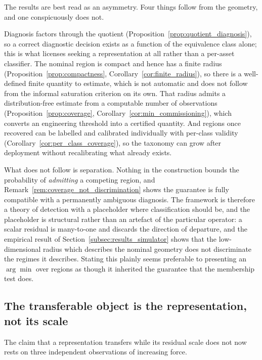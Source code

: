 \documentclass[a4paper]{cas-sc}
\begin{document}
The results are best read as an asymmetry. Four things follow from the
geometry, and one conspicuously does not.

Diagnosis factors through the quotient
(Proposition~\ref{prop:quotient_diagnosis}), so a correct diagnostic decision
exists as a function of the equivalence class alone; this is what licenses
seeking a representation at all rather than a per-asset classifier. The
nominal region is compact and hence has a finite radius
(Proposition~\ref{prop:compactness},
Corollary~\ref{cor:finite_radius}), so there is a well-defined finite quantity
to estimate, which is not automatic and does not follow from the informal
saturation criterion on its own. That radius admits a distribution-free
estimate from a computable number of observations
(Proposition~\ref{prop:coverage},
Corollary~\ref{cor:min_commissioning}), which converts an engineering
threshold into a certified quantity. And regions once recovered can be
labelled and calibrated individually with per-class validity
(Corollary~\ref{cor:per_class_coverage}), so the taxonomy can grow after
deployment without recalibrating what already exists.

What does not follow is separation. Nothing in the construction bounds the
probability of \emph{admitting} a competing region, and
Remark~\ref{rem:coverage_not_discrimination} shows the guarantee is fully
compatible with a permanently ambiguous diagnosis. The framework is therefore
a theory of detection with a placeholder where classification should be, and
the placeholder is structural rather than an artefact of the particular
operator: a scalar residual is many-to-one and discards the direction of
departure, and the empirical result of
Section~\ref{subsec:results_simulator} shows that the low-dimensional radius
which describes the nominal geometry does not discriminate the regimes it
describes. Stating this plainly seems preferable to presenting an
\(\arg\min\) over regions as though it inherited the guarantee that the
membership test does.

\subsection{The transferable object is the representation, not its scale}
\label{subsec:disc_scale}

The claim that a representation transfers while its residual scale does not
now rests on three independent observations of increasing force.
\end{document}
